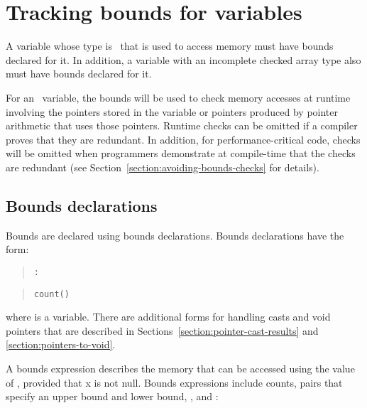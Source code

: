 
\chapter{Tracking bounds for variables}
\label{chapter:tracking-bounds}

A variable whose type is \arrayptr\ that is used to access
memory must have bounds declared for it. In addition, a variable with an
incomplete checked array type also must have bounds declared for it.

For an \arrayptr\ variable, the bounds will be used to check
memory accesses at runtime involving the pointers stored in the variable
or pointers produced by pointer arithmetic that uses those pointers.
Runtime checks can be omitted if a compiler proves that they are
redundant. In addition, for performance-critical code, checks will be
omitted when programmers demonstrate at compile-time that the checks are
redundant (see Section~\ref{section:avoiding-bounds-checks} for details).

\section{Bounds declarations}
\label{section:bounds-declarations}

Bounds are declared using bounds declarations. Bounds declarations have
the form:

\begin{quote}
 \texttt{:} 
\end{quote}


\begin{quote}
\texttt{count(}\texttt{)}


\boundsnone

\boundsany
\end{quote}

where  is a variable. There are additional forms for handling
casts and void pointers that are described in 
Sections~\ref{section:pointer-cast-results} and \ref{section:pointers-to-void}.

A bounds expression describes the memory that can be accessed using the
value of , provided that x is not null. Bounds expressions
include counts, pairs that specify an upper bound and lower bound,
\boundsnone, and \boundsany:

